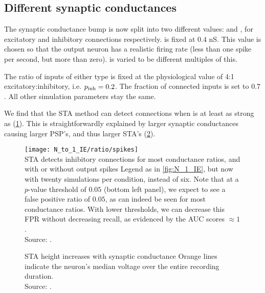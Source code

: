 \subsection{Different synaptic conductances}

The synaptic conductance bump \dgsyn is now split into two different values: \dgexc and \dginh, for excitatory and inhibitory connections respectively.
\dgexc is fixed at $0.4$ nS. This value is chosen so that the output neuron has a realistic firing rate (less than one spike per second, but more than zero). \dginh is varied to be different multiples of this.

The ratio of inputs of either type is fixed at the physiological value of 4:1 excitatory:inhibitory, i.e. $p_{\text{inh}} = 0.2$. The fraction of connected inputs \pconn is set to $0.7$. All other simulation parameters stay the same.

We find that the STA method can detect connections when \dginh is at least as strong as \dgexc (\cref{fig:IE_ratio_perf}). This is straightforwardly explained by larger synaptic conductances causing larger PSP's, and thus larger STA's (\cref{fig:IE_ratio_signals}).

\begin{figure}
        \texttt{[image: N\_to\_1\_IE/ratio/spikes]}\\[1em]
    \captionn
        {STA detects inhibitory connections for most conductance ratios, and with or without output spikes}
        {Legend as in \cref{fig:N_1_IE}, but now with twenty simulations per condition, instead of six.
        Note that at a $p$-value threshold of $0.05$ (bottom left panel), we expect to see a false positive ratio of $0.05$, as can indeed be seen for most conductance ratios. With lower thresholds, we can decrease this FPR without decreasing recall, as evidenced by the AUC scores $\approx 1$.\\
        Source: .
        }
  \label{fig:IE_ratio_perf}
\end{figure}

\begin{figure}
    \hspace*{-2.5em}
  \captionn
  {STA height increases with synaptic conductance}
  {Orange lines indicate the neuron's median voltage over the entire recording duration.\\
  Source: .}
  \label{fig:IE_ratio_signals}
\end{figure}


